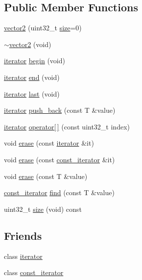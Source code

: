 \subsection*{Public Member Functions}
\begin{DoxyCompactItemize}
\item 
\hyperlink{classcrap_1_1vector2_ab35df962b27f1a8d23b9e3da54bc4bbe}{vector2} (uint32\+\_\+t \hyperlink{classcrap_1_1vector2_a79cc55b148a8c5913302aa2a19718bfd}{size}=0)
\item 
\hyperlink{classcrap_1_1vector2_a374512a6221815007ea92077ca4fbc75}{$\sim$vector2} (void)
\item 
\hyperlink{classcrap_1_1vector2_1_1iterator}{iterator} \hyperlink{classcrap_1_1vector2_a54cb855d23460ff53b0a962290e7a81e}{begin} (void)
\item 
\hyperlink{classcrap_1_1vector2_1_1iterator}{iterator} \hyperlink{classcrap_1_1vector2_a7ef9757c9e66213280465e9005acc65f}{end} (void)
\item 
\hyperlink{classcrap_1_1vector2_1_1iterator}{iterator} \hyperlink{classcrap_1_1vector2_ae2d9eece639897c9fc1d1fcb8f53e04e}{last} (void)
\item 
\hyperlink{classcrap_1_1vector2_1_1iterator}{iterator} \hyperlink{classcrap_1_1vector2_aea357486e88d28e9d7631fac7a28a392}{push\+\_\+back} (const T \&value)
\item 
\hyperlink{classcrap_1_1vector2_1_1iterator}{iterator} \hyperlink{classcrap_1_1vector2_a70140d53eff1fe13cc62d0d2d651cb14}{operator\mbox{[}$\,$\mbox{]}} (const uint32\+\_\+t index)
\item 
void \hyperlink{classcrap_1_1vector2_ad7094fa79135f658504bef125ef5c0af}{erase} (const \hyperlink{classcrap_1_1vector2_1_1iterator}{iterator} \&it)
\item 
void \hyperlink{classcrap_1_1vector2_a38ab3586e46403e9f7d27c299340bc5e}{erase} (const \hyperlink{classcrap_1_1vector2_1_1const__iterator}{const\+\_\+iterator} \&it)
\item 
void \hyperlink{classcrap_1_1vector2_a90fee0bfc820b92866dd0d731037f44e}{erase} (const T \&value)
\item 
\hyperlink{classcrap_1_1vector2_1_1const__iterator}{const\+\_\+iterator} \hyperlink{classcrap_1_1vector2_a00e8e66aa5d6f6a63baa798aff418286}{find} (const T \&value)
\item 
uint32\+\_\+t \hyperlink{classcrap_1_1vector2_a79cc55b148a8c5913302aa2a19718bfd}{size} (void) const 
\end{DoxyCompactItemize}
\subsection*{Friends}
\begin{DoxyCompactItemize}
\item 
class \hyperlink{classcrap_1_1vector2_a67171474c4da6cc8efe0c7fafefd2b2d}{iterator}
\item 
class \hyperlink{classcrap_1_1vector2_ac220ce1c155db1ac44146c12d178056f}{const\+\_\+iterator}
\end{DoxyCompactItemize}



